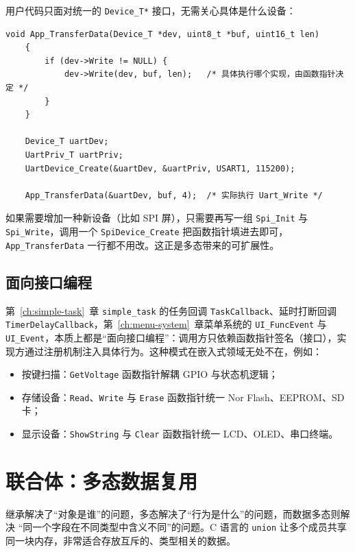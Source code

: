 用户代码只面对统一的 \texttt{Device\_T*} 接口，无需关心具体是什么设备：

\begin{lstlisting}[style=c]
	void App_TransferData(Device_T *dev, uint8_t *buf, uint16_t len)
	{
		if (dev->Write != NULL) {
			dev->Write(dev, buf, len);   /* 具体执行哪个实现，由函数指针决定 */
		}
	}
	
	Device_T uartDev;
	UartPriv_T uartPriv;
	UartDevice_Create(&uartDev, &uartPriv, USART1, 115200);
	
	App_TransferData(&uartDev, buf, 4);  /* 实际执行 Uart_Write */
\end{lstlisting}

如果需要增加一种新设备（比如 SPI 屏），只需要再写一组 \texttt{Spi\_Init} 与 \texttt{Spi\_Write}，调用一个 \texttt{SpiDevice\_Create} 把函数指针填进去即可，\texttt{App\_TransferData} 一行都不用改。这正是多态带来的可扩展性。

\subsection{面向接口编程}

第~\ref{ch:simple-task}~章 \texttt{simple\_task} 的任务回调 \texttt{TaskCallback}、延时打断回调 \texttt{TimerDelayCallback}，第~\ref{ch:menu-system}~章菜单系统的 \texttt{UI\_FuncEvent} 与 \texttt{UI\_Event}，本质上都是“面向接口编程”：调用方只依赖函数指针签名（接口），实现方通过注册机制注入具体行为。这种模式在嵌入式领域无处不在，例如：

\begin{itemize}
\item 按键扫描：\texttt{GetVoltage} 函数指针解耦 GPIO 与状态机逻辑；
\item 存储设备：\texttt{Read}、\texttt{Write} 与 \texttt{Erase} 函数指针统一 Nor Flash、EEPROM、SD 卡；
\item 显示设备：\texttt{ShowString} 与 \texttt{Clear} 函数指针统一 LCD、OLED、串口终端。
\end{itemize}

\section{联合体：多态数据复用}

继承解决了“对象是谁”的问题，多态解决了“行为是什么”的问题，而数据多态则解决 “同一个字段在不同类型中含义不同”的问题。C 语言的 \texttt{union} 让多个成员共享同一块内存，非常适合存放互斥的、类型相关的数据。

